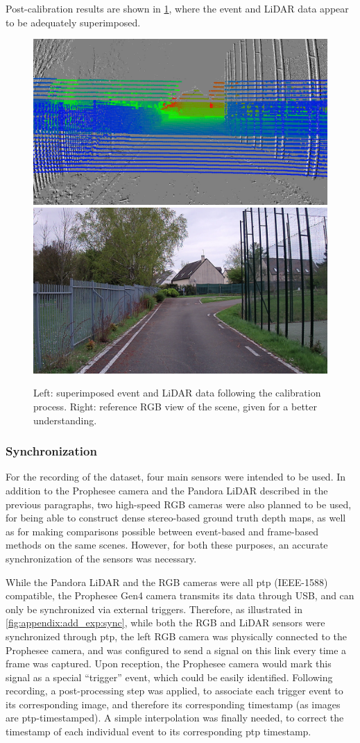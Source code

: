 Post-calibration results are shown in \cref{fig:appendix:add_exp:depth_superimposed}, where the event and LiDAR data appear to be adequately superimposed.

\begin{figure}
  \centering
  \includegraphics[width=0.49\linewidth]{mainmatter/figures/a_additional_exp/depth_dataset/evts_lidar_superimposed.png}
  \includegraphics[width=0.49\linewidth]{mainmatter/figures/a_additional_exp/depth_dataset/rgb_ref.png}
  \caption{Left: superimposed event and LiDAR data following the calibration process. Right: reference RGB view of the scene, given for a better understanding.}\label{fig:appendix:add_exp:depth_superimposed}
\end{figure}

\subsubsection{Synchronization}
For the recording of the dataset, four main sensors were intended to be used. In addition to the Prophesee camera and the Pandora LiDAR described in the previous paragraphs, two high-speed RGB cameras were also planned to be used, for being able to construct dense stereo-based ground truth depth maps, as well as for making comparisons possible between event-based and frame-based methods on the same scenes. However, for both these purposes, an accurate synchronization of the sensors was necessary.

While the Pandora LiDAR and the RGB cameras were all \acrshort{ptp} (IEEE-1588) compatible, the Prophesee Gen4 camera transmits its data through USB, and can only be synchronized via external triggers. Therefore, as illustrated in \cref{fig:appendix:add_exp:sync}, while both the RGB and LiDAR sensors were synchronized through \acrshort{ptp}, the left RGB camera was physically connected to the Prophesee camera, and was configured to send a signal on this link every time a frame was captured. Upon reception, the Prophesee camera would mark this signal as a special ``trigger'' event, which could be easily identified. Following recording, a post-processing step was applied, to associate each trigger event to its corresponding image, and therefore its corresponding timestamp (as images are \acrshort{ptp}-timestamped). A simple interpolation was finally needed, to correct the timestamp of each individual event to its corresponding \acrshort{ptp} timestamp.


